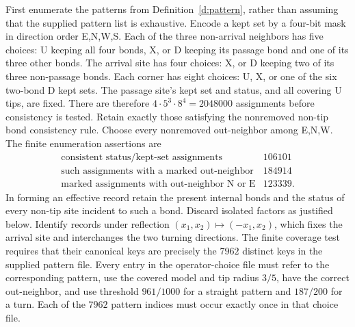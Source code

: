 First enumerate the patterns from Definition~\ref{d:pattern},
rather than assuming that the supplied pattern list is exhaustive.
Encode a kept set by a four-bit mask in direction order E,N,W,S.
Each of the three non-arrival neighbors has five choices: U
keeping all four bonds, X, or D keeping its passage bond and one
of its three other bonds. The arrival site has four choices: X,
or D keeping two of its three non-passage bonds. Each corner has
eight choices: U, X, or one of the six two-bond D kept sets.
The passage site's kept set and status, and all covering U tips,
are fixed. There are therefore
\(4\cdot5^3\cdot8^4=2048000\) assignments before consistency is
tested. Retain exactly those satisfying the nonremoved non-tip
bond consistency rule. Choose every nonremoved out-neighbor
among E,N,W. The finite enumeration assertions are
\[
 \begin{array}{c|r}
 \text{consistent status/kept-set assignments}&106101\\
 \text{such assignments with a marked out-neighbor}&184914\\
 \text{marked assignments with out-neighbor N or E}&123339.
 \end{array}
\]
In forming an effective record retain the present internal bonds
and the status of every non-tip site incident to such a bond.
Discard isolated factors as justified below. Identify records under
reflection \((x_1,x_2)\mapsto(-x_1,x_2)\), which fixes the arrival
site and interchanges the two turning directions. The finite
coverage test requires that their canonical keys are precisely
the \(7962\) distinct keys in the supplied pattern file. Every
entry in the operator-choice file must refer to the corresponding
pattern, use the covered model and tip radius \(3/5\), have the
correct out-neighbor, and use threshold \(961/1000\) for a
straight pattern and \(187/200\) for a turn. Each of the \(7962\)
pattern indices must occur exactly once in that choice file.


